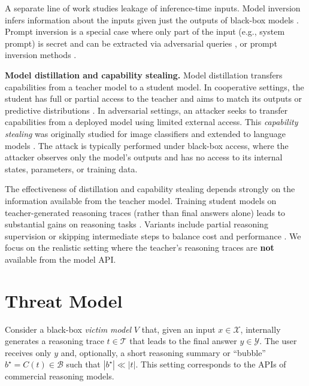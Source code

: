 \documentclass{article}
\newcommand\shortsection[1]{\vspace{.75ex}{\noindent\bf #1.}}
\begin{document}
A separate line of work studies leakage of inference-time inputs.  Model inversion infers information about the inputs given just the outputs of black-box models \citep{morris2024language}.  Prompt inversion is a special case where only part of the input (e.g., system prompt) is secret and can be extracted via adversarial queries \citep{zhang2024effective}, or prompt inversion methods \citep{zhang2024extracting,yang2024prsa}. 

\textbf{Model distillation and capability stealing.}
Model distillation transfers capabilities from a teacher model to a student model. In cooperative settings, the student has full or partial access to the teacher and aims to match its outputs or predictive distributions \citep{hinton2015distilling}. In adversarial settings, an attacker seeks to transfer capabilities from a deployed model using limited external access.  This \emph{capability stealing} was originally studied for image classifiers \citep{tramer2016stealing,orekondy2019knockoff} and extended to language models \citep{krishna2019thieves, wallace2020imitation}.  The attack is typically performed under black-box access, where the attacker observes only the model's outputs and has no access to its internal states, parameters, or training data.


The effectiveness of distillation and capability stealing depends strongly on the information available from the teacher model.  Training student models on teacher-generated reasoning traces (rather than final answers alone) leads to substantial gains on reasoning tasks \citep{wei2022chain,shridhar2023distilling}. Variants include partial reasoning supervision or skipping intermediate steps to balance cost and performance \citep{chen2025skip}.  We focus on the realistic setting where the teacher's reasoning traces are \textbf{not} available from the model API. 


\section{Threat Model}
\label{sec:threat-model}

\shortsection{Problem setting}
Consider a black-box \emph{victim model} \(V\) that, given an input \(x \in \mathcal{X}\), internally generates a reasoning trace \(t \in \mathcal{T}\) that leads to the
final answer \(y \in \mathcal{Y}\).  The user receives only $y$ and, optionally, a short reasoning summary or ``bubble'' \(b^{\star} = C(t) \in \mathcal{B}\) such that \(|b^{\star}| \ll |t|\).  This setting corresponds to the APIs of commercial reasoning models.
\end{document}
